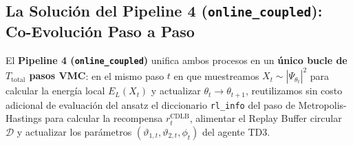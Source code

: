 \documentclass[10pt,a4paper]{article}
\begin{document}
\subsection{La Soluci\'on del Pipeline 4 (\texttt{online\_coupled}): Co-Evoluci\'on Paso a Paso}

El \textbf{Pipeline 4 (\texttt{online\_coupled})} unifica ambos procesos en un \textbf{\'unico bucle de $T_{\mathrm{total}}$ pasos VMC}: en el mismo paso $t$ en que muestreamos $X_t \sim |\Psi_{\theta_t}|^2$ para calcular la energ\'ia local $E_L(X_t)$ y actualizar $\theta_t \to \theta_{t+1}$, reutilizamos sin costo adicional de evaluaci\'on del ansatz el diccionario \texttt{rl\_info} del paso de Metropolis-Hastings para calcular la recompensa $r_t^{\mathrm{CDLB}}$, alimentar el Replay Buffer circular $\mathcal{D}$ y actualizar los par\'ametros $(\vartheta_{1,t}, \vartheta_{2,t}, \phi_t)$ del agente TD3.
\end{document}
